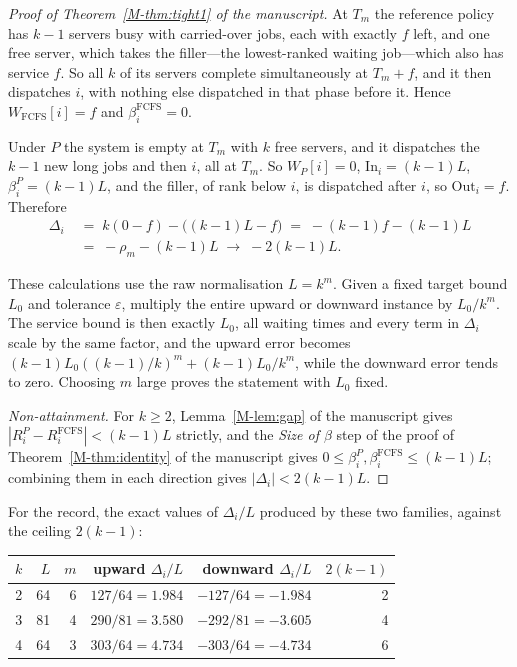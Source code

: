 \documentclass[mathematics,supfile,submit,moreauthors]{Definitions/mdpi}
\begin{document}
\begin{proof}[Proof of Theorem~\ref*{M-thm:tight1} of the manuscript]
At $T_m$ the reference policy has $k-1$ servers busy with carried-over jobs,
each with exactly $f$ left, and one free server, which takes the filler---the
lowest-ranked waiting job---which also has service $f$. So all $k$ of its
servers complete simultaneously at $T_m + f$, and it then dispatches $i$, with
nothing else dispatched in that phase before it. Hence
$W_{\mathrm{FCFS}}[i] = f$ and $\beta^{\mathrm{FCFS}}_i = 0$.

Under $P$ the system is empty at $T_m$ with $k$ free servers, and it dispatches
the $k-1$ new long jobs and then $i$, all at $T_m$. So $W_P[i] = 0$,
$\mathrm{In}_i = (k-1)L$, $\beta^P_i = (k-1)L$, and the filler, of rank below
$i$, is dispatched after $i$, so $\mathrm{Out}_i = f$. Therefore
\begin{align*}
  \Delta_i \;&=\; k(0 - f) - \bigl((k-1)L - f\bigr)
           \;=\; -(k-1)f - (k-1)L \\
           \;&=\; -\rho_m - (k-1)L \;\longrightarrow\; -2(k-1)L .
\end{align*}

These calculations use the raw normalisation $L=k^m$. Given a fixed target
bound $L_0$ and tolerance $\varepsilon$, multiply the entire upward or downward
instance by $L_0/k^m$. The service bound is then exactly $L_0$, all waiting
times and every term in $\Delta_i$ scale by the same factor, and the upward
error becomes
$(k-1)L_0((k-1)/k)^m+(k-1)L_0/k^m$, while the downward error tends to zero.
Choosing $m$ large proves the statement with $L_0$ fixed.

\emph{Non-attainment.} For $k \ge 2$, Lemma~\ref*{M-lem:gap} of the manuscript gives
$|R^P_i - R^{\mathrm{FCFS}}_i| < (k-1)L$ strictly, and the \emph{Size of
$\beta$} step of the proof of
Theorem~\ref*{M-thm:identity} of the manuscript gives $0 \le \beta^P_i, \beta^{\mathrm{FCFS}}_i \le
(k-1)L$; combining them in each direction gives $|\Delta_i| < 2(k-1)L$.
\end{proof}

For the record, the exact values of $\Delta_i / L$ produced by these two
families, against the ceiling $2(k-1)$:

\begin{center}
\begin{tabular}{rrrrrr}
\hline
$k$ & $L$ & $m$ & upward $\Delta_i/L$ & downward $\Delta_i/L$ & $2(k-1)$ \\
\hline
2 & 64 & 6 & $127/64 = 1.984$ & $-127/64 = -1.984$ & 2 \\
3 & 81 & 4 & $290/81 = 3.580$ & $-292/81 = -3.605$ & 4 \\
4 & 64 & 3 & $303/64 = 4.734$ & $-303/64 = -4.734$ & 6 \\
\hline
\end{tabular}
\end{center}
\end{document}
